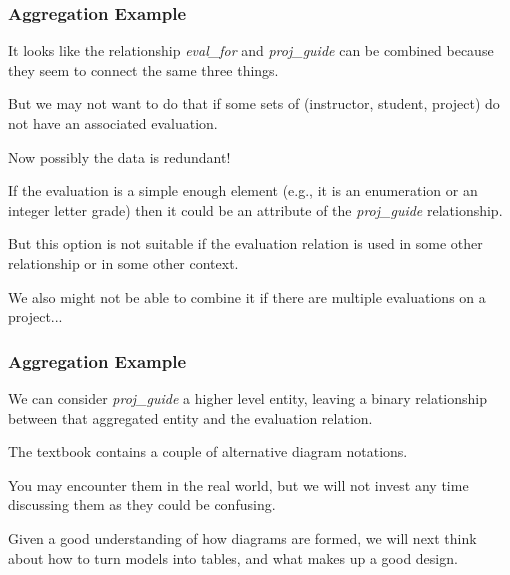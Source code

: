\begin{frame}
\frametitle{Aggregation Example}

It looks like the relationship \textit{eval\_for} and \textit{proj\_guide} can be combined because they seem to connect the same three things. 

But we may not want to do that if some sets of (instructor, student, project) do not have an associated evaluation. 

Now possibly the data is redundant! 

If the evaluation is a simple enough element (e.g., it is an enumeration or an integer letter grade) then it could be an attribute of the \textit{proj\_guide} relationship. 

But this option is not suitable if the evaluation relation is used in some other relationship or in some other context. 

We  also might not be able to combine it if there are multiple evaluations on a project...

\end{frame}



\begin{frame}
\frametitle{Aggregation Example}

We can consider \textit{proj\_guide} a higher level entity,  leaving a binary relationship between that aggregated entity and the evaluation relation.

The textbook contains a couple of alternative diagram notations. 

You may encounter them in the real world, but we will not invest any time discussing them as they could be confusing.

Given a good understanding of how diagrams are formed, we will next think about how to turn models into tables, and what makes up a good design.



\end{frame}





